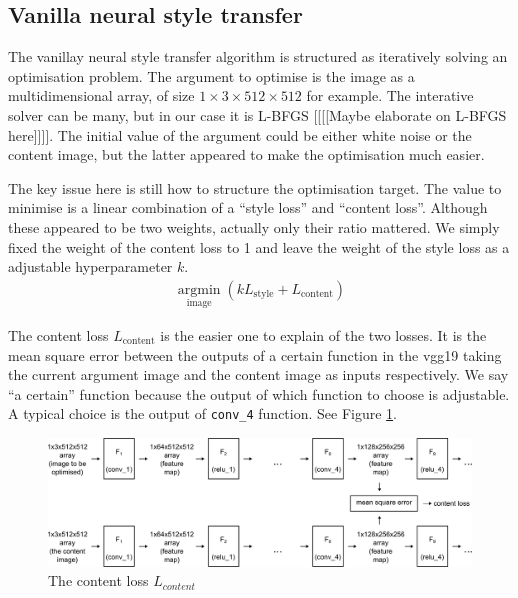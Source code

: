 \documentclass[runningheads]{llncs}
\DeclareMathOperator*{\argmin}{argmin}
\begin{document}
\subsection{Vanilla neural style transfer}

The vanillay neural style transfer algorithm \cite{nst} is 
structured as iteratively solving an optimisation problem.
The argument to optimise is the image as a multidimensional array,
of size $1\times3\times512\times512$ for example.
The interative solver can be many, but in our case it is 
L-BFGS [[[[Maybe elaborate on L-BFGS here]]]]. 
The initial value of the argument could be either white noise or the content image,
but the latter appeared to make the optimisation much easier.

The key issue here is still how to structure the optimisation target.
The value to minimise is a linear combination of a ``style loss'' 
and ``content loss''.
Although these appeared to be two weights,
actually only their ratio mattered.
We simply fixed the weight of the content loss to 1 and
leave the weight of the style loss as a adjustable hyperparameter $k$.
\begin{align}
\argmin\limits_{\text{image}} (kL_\text{style}+L_\text{content})
\end{align}

The content loss $L_\text{content}$ is the easier one to explain of the two losses.
It is the mean square error between the outputs of a certain function in the
vgg19 taking the current argument image and the content image as inputs respectively.
We say ``a certain'' function because the output of which function to choose is
adjustable.
A typical choice is the output of \verb|conv_4| function. See Figure \ref{contentloss}.
\begin{figure}
\center
\includegraphics[width=\textwidth]{contentloss.pdf}
\caption{The content loss $L_{content}$ \label{contentloss}}
\end{figure}
\end{document}
